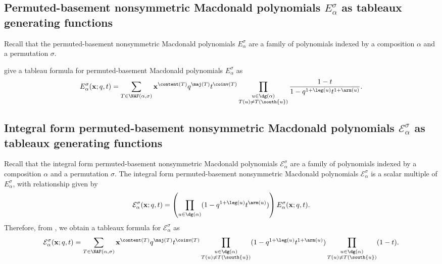 \subsection{Permuted-basement nonsymmetric Macdonald polynomials \texorpdfstring{\(E_\alpha^\sigma\)}{Eασ} as tableaux generating functions}
\label{sec:tableau-formula}

Recall that the permuted-basement nonsymmetric Macdonald polynomials \(E_\alpha^\sigma\) are a family of polynomials indexed by a composition \(\alpha\) and a permutation \(\sigma\).

\cite[Definition~4.4.2]{Fer11} give a tableau formula for permuted-basement Macdonald polynomials \(E_\alpha^\sigma\) as
\begin{equation} \label{eq:E-NAF-unsigned}
	E^{\sigma}_{\alpha}(\mathbf{x}; q, t) =
	\sum_{T \in \NAF(\alpha, \sigma)}
	\mathbf{x}^{\content(T)}
	q^{\maj(T)} t^{\coinv(T)}
	\prod_{\substack{u \in \dg(\alpha) \\ T(u) \neq T(\south{u})}}
	\frac{1 - t}{1 - q^{1 + \leg(u)} t^{1 + \arm(u)}}.
\end{equation}

\subsection{Integral form permuted-basement nonsymmetric Macdonald polynomials \texorpdfstring{\(\mathcal{E}_\alpha^\sigma\)}{Eασ} as tableaux generating functions}

Recall that the integral form permuted-basement nonsymmetric Macdonald polynomials \(\mathcal{E}_\alpha^\sigma\) are a family of polynomials indexed by a composition \(\alpha\) and a permutation \(\sigma\).
The integral form permuted-basement nonsymmetric Macdonald polynomials \(\mathcal{E}_\alpha^\sigma\) is a scalar multiple of \(E_\alpha^\sigma\), with relationship given by
\begin{equation}
	\mathcal{E}_\alpha^\sigma(\mathbf{x}; q, t)
	=
	\left(
		\prod_{u \in \dg(\alpha)} (1 - q^{1 + \leg(u)} t^{\arm(u)})
	\right)
	E_\alpha^\sigma(\mathbf{x}; q, t).
\end{equation}
Therefore, from , we obtain a tableaux formula for \(\mathcal{E}_\alpha^\sigma\) as
\begin{equation} \label{eq:calE-NAF-unsigned}
	\mathcal{E}^{\sigma}_{\alpha}(\mathbf{x}; q, t) =
	\sum_{T \in \NAF(\alpha, \sigma)}
	\mathbf{x}^{\content(T)}
	q^{\maj(T)} t^{\coinv(T)}
	\prod_{\substack{u \in \dg(\alpha) \\ T(u) \neq T(\south{u})}}
	(1 - q^{1 + \leg(u)} t^{1 + \arm(u)})
	\prod_{\substack{u \in \dg(\alpha) \\ T(u) \neq T(\south{u})}}
	(1 - t).
\end{equation}

